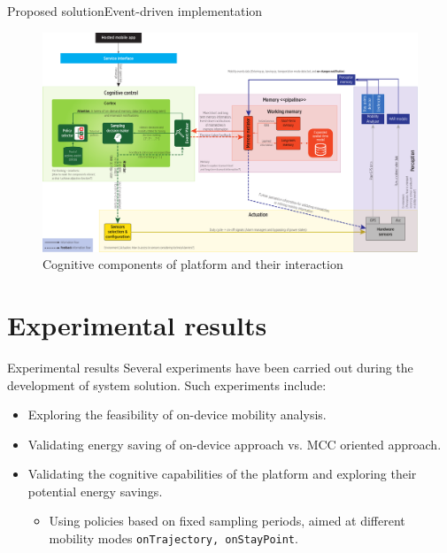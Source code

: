 \documentclass[8pt,xcolor={dvipsnames},handout]{beamer}
\begin{document}
\begin{frame}{Proposed solution}{Event-driven implementation}
\begin{figure}
  \centering
  \includegraphics[width=1\textwidth]{vectors/smartness-components-v4-for-slides}
  \caption{Cognitive components of platform and their interaction}
  \label{fig:cognitive-components}
\end{figure}
\end{frame}

\section{Experimental results}
\begin{frame}{Experimental results}
Several experiments have been carried out during the development of system solution.
Such experiments include:
\begin{itemize}
  \item Exploring the feasibility of on-device mobility analysis.
  \item Validating energy saving of on-device approach vs. MCC oriented approach.
  \item Validating the cognitive capabilities of the platform and exploring their potential energy savings.
  \begin{itemize}
    \item Using policies based on fixed sampling periods, aimed at different mobility modes \texttt{\small onTrajectory, onStayPoint}.
  \end{itemize}
\end{itemize}
\end{frame}
\end{document}
